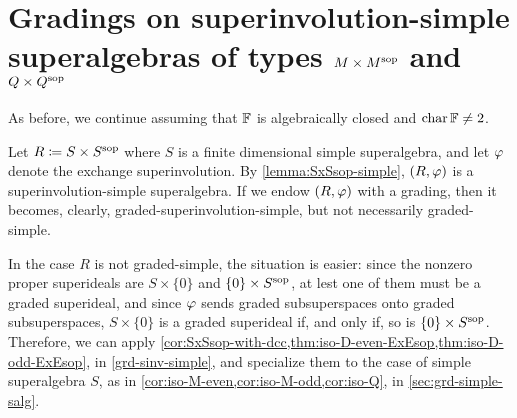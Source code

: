 \section[Gradings on superinvolution-simple superalgebras of types  \texorpdfstring{$M\times M\sop$ and $Q\times Q\sop$}{MxMsop and QxQsop}]{Gradings on superinvolution-simple \\ superalgebras of types $M\times M\sop$ and $Q\times Q\sop$}\label{sec:MxM-and-QxQ-associative}

As before, we continue assuming that $\mathbb{F}$ is algebraically closed and $\operatorname{char} \mathbb{F} \neq 2$. 

Let $R \coloneqq S \times S^{\mathrm{sop}}$ where $S$ is a finite dimensional simple superalgebra, and let $\varphi$ denote the exchange superinvolution. 
By \cref{lemma:SxSsop-simple}, $(R, \varphi)$ is a superinvolution-simple superalgebra. 
If we endow $(R, \varphi)$ with a grading, then it becomes, clearly, graded-superinvolution-simple, but not necessarily graded-simple. 

In the case $R$ is not graded-simple, the situation is easier: since the nonzero proper superideals are $S \times \{ 0 \}$ and $\{ 0 \} \times S^{\mathrm{sop}}$, at lest one of them must be a graded superideal, and since $\varphi$ sends graded subsuperspaces onto graded subsuperspaces, $S \times \{ 0 \}$ is a graded superideal if, and only if, so is $\{ 0 \} \times S^{\mathrm{sop}}$. 
Therefore, we can apply  \cref{cor:SxSsop-with-dcc,thm:iso-D-even-ExEsop,thm:iso-D-odd-ExEsop}, in \cref{grd-sinv-simple}, and specialize them to the case of simple superalgebra $S$, as in  \cref{cor:iso-M-even,cor:iso-M-odd,cor:iso-Q}, in \cref{sec:grd-simple-salg}.

